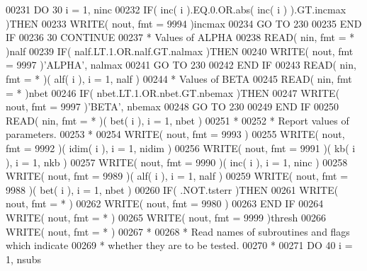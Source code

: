 \begin{DoxyCode}
00231       \textcolor{keywordflow}{DO} 30 i = 1, ninc
00232          \textcolor{keywordflow}{IF}( inc( i ).EQ.0.OR.abs( inc( i ) ).GT.incmax )\textcolor{keywordflow}{THEN}
00233             \textcolor{keyword}{WRITE}( nout, fmt = 9994 )incmax
00234             \textcolor{keywordflow}{GO TO} 230
00235 \textcolor{keywordflow}{         END IF}
00236    30 \textcolor{keywordflow}{CONTINUE}
00237 \textcolor{comment}{*     Values of ALPHA}
00238       \textcolor{keyword}{READ}( nin, fmt = * )nalf
00239       \textcolor{keywordflow}{IF}( nalf.LT.1.OR.nalf.GT.nalmax )\textcolor{keywordflow}{THEN}
00240          \textcolor{keyword}{WRITE}( nout, fmt = 9997 )\textcolor{stringliteral}{'ALPHA'}, nalmax
00241          \textcolor{keywordflow}{GO TO} 230
00242 \textcolor{keywordflow}{      END IF}
00243       \textcolor{keyword}{READ}( nin, fmt = * )( alf( i ), i = 1, nalf )
00244 \textcolor{comment}{*     Values of BETA}
00245       \textcolor{keyword}{READ}( nin, fmt = * )nbet
00246       \textcolor{keywordflow}{IF}( nbet.LT.1.OR.nbet.GT.nbemax )\textcolor{keywordflow}{THEN}
00247          \textcolor{keyword}{WRITE}( nout, fmt = 9997 )\textcolor{stringliteral}{'BETA'}, nbemax
00248          \textcolor{keywordflow}{GO TO} 230
00249 \textcolor{keywordflow}{      END IF}
00250       \textcolor{keyword}{READ}( nin, fmt = * )( bet( i ), i = 1, nbet )
00251 \textcolor{comment}{*}
00252 \textcolor{comment}{*     Report values of parameters.}
00253 \textcolor{comment}{*}
00254       \textcolor{keyword}{WRITE}( nout, fmt = 9993 )
00255       \textcolor{keyword}{WRITE}( nout, fmt = 9992 )( idim( i ), i = 1, nidim )
00256       \textcolor{keyword}{WRITE}( nout, fmt = 9991 )( kb( i ), i = 1, nkb )
00257       \textcolor{keyword}{WRITE}( nout, fmt = 9990 )( inc( i ), i = 1, ninc )
00258       \textcolor{keyword}{WRITE}( nout, fmt = 9989 )( alf( i ), i = 1, nalf )
00259       \textcolor{keyword}{WRITE}( nout, fmt = 9988 )( bet( i ), i = 1, nbet )
00260       \textcolor{keywordflow}{IF}( .NOT.tsterr )\textcolor{keywordflow}{THEN}
00261          \textcolor{keyword}{WRITE}( nout, fmt = * )
00262          \textcolor{keyword}{WRITE}( nout, fmt = 9980 )
00263 \textcolor{keywordflow}{      END IF}
00264       \textcolor{keyword}{WRITE}( nout, fmt = * )
00265       \textcolor{keyword}{WRITE}( nout, fmt = 9999 )thresh
00266       \textcolor{keyword}{WRITE}( nout, fmt = * )
00267 \textcolor{comment}{*}
00268 \textcolor{comment}{*     Read names of subroutines and flags which indicate}
00269 \textcolor{comment}{*     whether they are to be tested.}
00270 \textcolor{comment}{*}
00271       \textcolor{keywordflow}{DO} 40 i = 1, nsubs

\end{DoxyCode}
